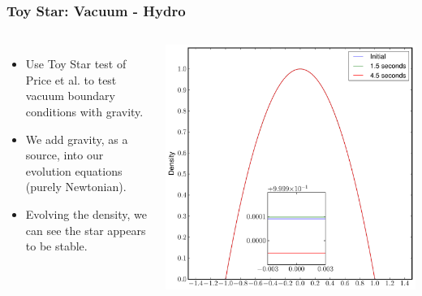 \documentclass{beamer}
\begin{document}
\begin{frame}
\frametitle{Toy Star: Vacuum - Hydro}
\begin{columns}
\begin{itemize}
\item{Use Toy Star test of Price et al. to test vacuum boundary conditions with gravity.}
\item{We add gravity, as a source, into our evolution equations (purely Newtonian).}
\item{Evolving the density, we can see the star appears to be stable.}
\end{itemize}
\centering
\includegraphics[width=\textwidth]{../images/toy_density}
\end{columns}
\end{frame}
\end{document}
